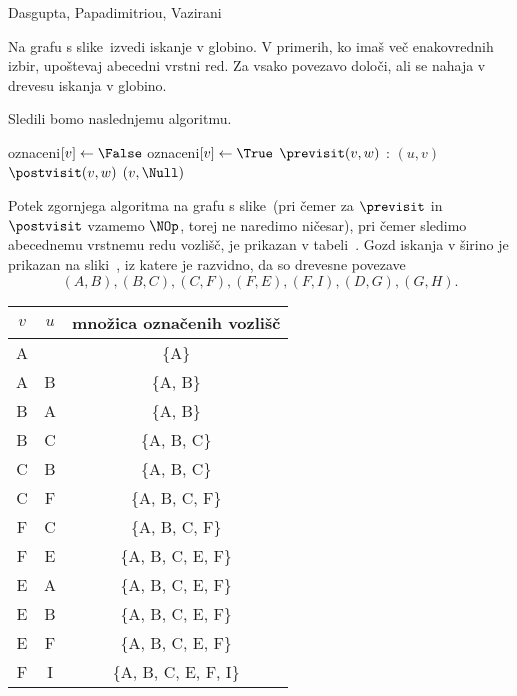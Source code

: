 \begin{naloga}%
{Dasgupta, Papadimitriou, Vazirani}{\cite[Exercise~3.1]{dpv}}
\begin{vprasanje}
Na grafu s slike~\fig[bfs] izvedi iskanje v globino.
V primerih, ko imaš več ena\-ko\-vred\-nih izbir,
upoštevaj abecedni vrstni red.
Za vsako povezavo določi, ali se nahaja v drevesu iskanja v globino.
\end{vprasanje}

\begin{odgovor}
Sledili bomo naslednjemu algoritmu.
\begin{small}
\begin{algorithmic}
		\State oznaceni$[v] \gets \False$
	\EndFor
            \State \Return
        \EndIf
        \State oznaceni$[v] \gets \True$
        \State $\previsit(v, w)$
		:
            $(u, v)$
		\EndFor
        \State $\postvisit(v, w)$
    \EndFunction
		$(v, \Null)$
	\EndFor
\EndFunction
\end{algorithmic}
\end{small}
%
Potek zgornjega algoritma na grafu s slike~\fig[bfs]
(pri čemer za $\previsit$ in $\postvisit$ vzamemo $\NOp$,
torej ne naredimo ničesar),
pri čemer sledimo abecednemu vrstnemu redu vozlišč,
je prikazan v tabeli~\tab.
Gozd iskanja v širino je prikazan na sliki~\fig,
iz katere je razvidno, da so drevesne povezave
$$
(A, B), (B, C), (C, F), (F, E), (F, I), (D, G), (G, H).
$$
\begin{tabela}
\begin{tabular}{c|c|c}
$v$ & $u$ & množica označenih vozlišč \\ \hline
A &   & \{A\} \\
A &B & \{A, B\} \\
B & A &  \{A, B\} \\
B & C &  \{A, B, C\} \\
C & B & \{A, B, C\} \\
C & F & \{A, B, C, F\} \\
F & C & \{A, B, C, F\} \\
F & E & \{A, B, C, E, F\} \\
E & A & \{A, B, C, E, F\} \\
E & B & \{A, B, C, E, F\} \\
E & F & \{A, B, C, E, F\} \\
F & I & \{A, B, C, E, F, I\} \\

\end{tabular}
\end{tabela}
\end{odgovor}
\end{naloga}
